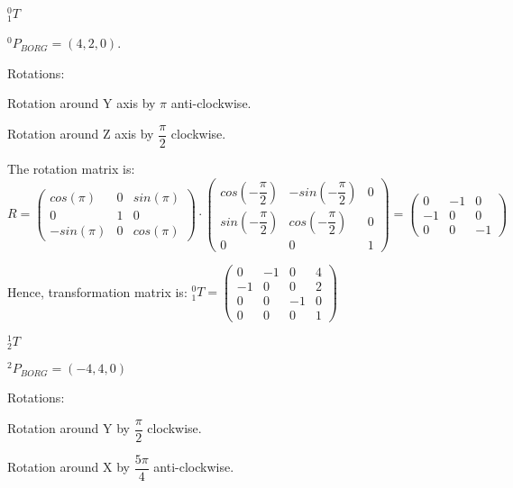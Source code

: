 \documentclass[12pt]{article}
\begin{document}
\newpage

\begin{list}{)~}{}
\item
$_{1}^{0}T$

$^0 P_{BORG} = \left(4, 2, 0\right)$.

Rotations:

\begin{list}{)~}{}
\item Rotation around Y axis by $\pi$ anti-clockwise.
\item Rotation around Z axis by $\dfrac{\pi}{2}$ clockwise.
\end{list}

The rotation matrix is:
$R=\left(\begin{array}{ccc}
cos(\pi) & 0 & sin(\pi) \\
0 & 1 & 0 \\
-sin(\pi) & 0 & cos(\pi) \end{array}\right) \cdot 
\left(\begin{array}{ccc}
cos \left(- \dfrac{\pi}{2} \right) & -sin \left(- \dfrac{\pi}{2} \right) & 0 \\
sin \left( - \dfrac{\pi}{2} \right) & cos \left( - \dfrac{\pi}{2} \right) & 0 \\
0 & 0 & 1\end{array}\right) = 
\left(\begin{array}{ccc}
0 & -1 & 0 \\
-1 & 0 & 0 \\
0 & 0 & -1\end{array}\right)$

Hence, transformation matrix is:
$_{1}^{0}T = \left(\begin{array}{cccc}
0 & -1 & 0 & 4 \\
-1 & 0 & 0 & 2\\
0 & 0 & -1 & 0\\
0 & 0 & 0 & 1\end{array}\right)$

\item
$_{2}^1T$

$^2 P_{BORG} = \left(-4, 4, 0\right)$

Rotations:
\begin{list}{)~}{}
\item Rotation around Y by $\dfrac{\pi}{2}$ clockwise.
\item Rotation around X by $\dfrac{5 \pi}{4}$ anti-clockwise.
\end{list}


\end{list}
\end{document}
